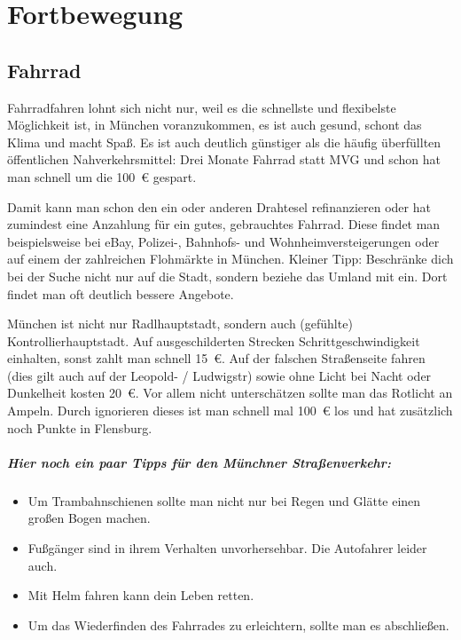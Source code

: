 ﻿
\chapter{Fortbewegung}

\section{Fahrrad}

Fahrradfahren lohnt sich nicht nur, weil es die schnellste und
flexibelste Möglichkeit ist, in München voranzukommen, es ist auch
gesund, schont das Klima und macht Spaß.  Es ist auch deutlich
günstiger als die häufig überfüllten öffentlichen Nahverkehrsmittel:
Drei Monate Fahrrad statt MVG und schon hat man schnell um die 100~€
gespart.

Damit kann man schon den ein oder anderen Drahtesel refinanzieren oder
hat zumindest eine Anzahlung für ein gutes, gebrauchtes Fahrrad. Diese
findet man beispielsweise bei eBay, Polizei-, Bahnhofs- und
Wohnheimversteigerungen oder auf einem der zahlreichen Flohmärkte in
München. Kleiner Tipp: Beschränke dich bei der Suche nicht nur auf die
Stadt, sondern beziehe das Umland mit ein. Dort findet man oft
deutlich bessere Angebote.

München ist nicht nur Radlhauptstadt, sondern auch (gefühlte) Kontrollierhauptstadt. Auf ausgeschilderten Strecken Schrittgeschwindigkeit einhalten, sonst zahlt man schnell 15~€. Auf der falschen Straßenseite fahren (dies gilt auch auf der Leopold- / Ludwigstr) sowie ohne Licht bei Nacht oder Dunkelheit kosten 20~€.
Vor allem nicht unterschätzen sollte man das Rotlicht an Ampeln. Durch ignorieren dieses ist man schnell mal 100~€ los und hat zusätzlich noch Punkte in Flensburg.

\paragraph{Hier noch ein paar Tipps für den Münchner Straßenverkehr:}
\begin{itemize}
	\item Um Trambahnschienen sollte man nicht nur bei Regen und Glätte einen großen Bogen machen.
	\item Fußgänger sind in ihrem Verhalten unvorhersehbar. Die Autofahrer leider auch.
	\item Mit Helm fahren kann dein Leben retten.
	\item Um das Wiederfinden des Fahrrades zu erleichtern, sollte man es abschließen.
	
\end{itemize}

